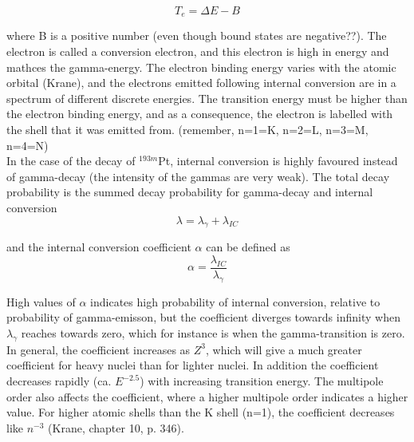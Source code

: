 \begin{equation}
    T_e = \Delta E - B
\end{equation}

where B is a positive number (even though bound states are negative??). The electron is called a conversion electron, and this electron is high in energy and mathces the gamma-energy. 
The electron binding energy varies with the atomic orbital (Krane), and the electrons emitted following internal conversion are in a spectrum of different discrete energies. The transition energy must be higher than the electron binding energy, and as a consequence, the electron is labelled with the shell that it was emitted from. (remember, n=1=K, n=2=L, n=3=M, n=4=N) \\ 

In the case of the decay of $^{193m}$Pt, internal conversion is highly favoured instead of gamma-decay (the intensity of the gammas are very weak). The total decay probability is the summed decay probability for gamma-decay and internal conversion
\begin{equation}
\lambda = \lambda_\gamma + \lambda_{IC}    
\end{equation}

and the internal conversion coefficient $\alpha$ can be defined as
\begin{equation}
    \alpha = \frac{\lambda_{IC}}{\lambda_\gamma}
\end{equation}

High values of $\alpha$ indicates high probability of internal conversion, relative to probability of gamma-emisson, but the coefficient diverges towards infinity when $\lambda_\gamma$ reaches towards zero, which for instance is when the gamma-transition is zero. In general, the coefficient increases as $Z^3$, which will give a much greater coefficient for heavy nuclei than for lighter nuclei. In addition the coefficient decreases rapidly (ca. $E^{-2.5}$) with increasing transition energy. The multipole order also affects the coefficient, where a higher multipole order indicates a higher value. For higher atomic shells than the K shell (n=1), the coefficient decreases like $n^{-3}$ (Krane, chapter 10, p. 346). \\

